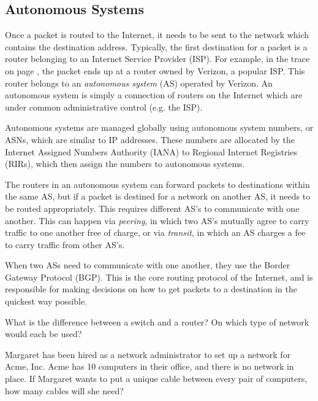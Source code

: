 \subsection{Autonomous Systems}

Once a packet is routed to the Internet, it needs to be sent to the network which contains the destination address. Typically, the first destination for a packet is a router belonging to an Internet Service Provider (ISP). For example, in the  trace on page \pageref{code:traceroute}, the packet ends up at a router owned by Verizon, a popular ISP. This router belongs to an \emph{autonomous system} (AS) operated by Verizon. An autonomous system is simply a connection of routers on the Internet which are under common administrative control (e.g. the ISP).

Autonomous systems are managed globally using autonomous system numbers, or ASNs, which are similar to IP addresses. These numbers are allocated by the Internet Assigned Numbers Authority (IANA) to Regional Internet Registries (RIRs), which then assign the numbers to autonomous systems.

The routers in an autonomous system can forward packets to destinations within the same AS, but if a packet is destined for a network on another AS, it needs to be routed appropriately. This requires different AS's to communicate with one another. This can happen via \emph{peering}, in which two AS's mutually agree to carry traffic to one another free of charge, or via \emph{transit}, in which an AS charges a fee to carry traffic from other AS's.

When two ASs need to communicate with one another, they use the Border Gateway Protocol (BGP). This is the core routing protocol of the Internet, and is responsible for making decisions on how to get packets to a destination in the quickest way possible. 

\exercisesection

\begin{exercise}
    What is the difference between a switch and a router? On which type of network would each be used?
\end{exercise}

\begin{exercise}
    Margaret has been hired as a network administrator to set up a network for Acme, Inc. Acme has 10 computers in their office, and there is no network in place. If Margaret wants to put a unique cable between every pair of computers, how many cables will she need? 
\end{exercise}

